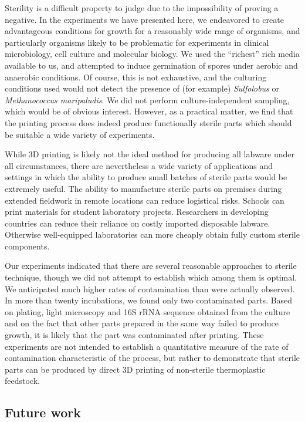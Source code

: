 \begin{refsection}
Sterility is a difficult property to judge due to the impossibility of
proving a negative. In the experiments we have presented here, we
endeavored to create advantageous conditions for growth for a
reasonably wide range of organisms, and particularly organisms likely
to be problematic for experiments in clinical microbiology, cell
culture and molecular biology. We used the ``richest'' rich media
available to us, and attempted to induce germination of spores under
aerobic and anaerobic conditions. Of course, this is not exhaustive,
and the culturing conditions used would not detect the presence of
(for example) {\em Sulfolobus} or {\em Methanococcus maripaludis}. We
did not perform culture-independent sampling, which would be of
obvious interest. However, as a practical matter, we find that the
printing process does indeed produce functionally sterile parts which
should be suitable a wide variety of experiments.

While 3D printing is likely not the ideal method for producing all
labware under all circumstances, there are nevertheless a wide variety
of applications and settings in which the ability to produce small
batches of sterile parts would be extremely useful. The ability to
manufacture sterile parts on premises during extended fieldwork in
remote locations can reduce logistical risks. Schools can print
materials for student laboratory projects.  Researchers in developing
countries can reduce their reliance on costly imported disposable
labware. Otherwise well-equipped laboratories can more cheaply obtain
fully custom sterile components.

Our experiments indicated that there are several reasonable approaches
to sterile technique, though we did not attempt to establish which
among them is optimal. We anticipated much higher rates of
contamination than were actually observed. In more than twenty
incubations, we found only two contaminated parts. Based on plating,
light microscopy and 16S rRNA sequence obtained from the culture and
on the fact that other parts prepared in the same way failed to
produce growth, it is likely that the part was contaminated after
printing.  These experiments are not intended to establish a
quantitative measure of the rate of contamination characteristic of
the process, but rather to demonstrate that sterile parts can be
produced by direct 3D printing of non-sterile thermoplastic feedstock.

\subsection{Future work}


\end{refsection}
